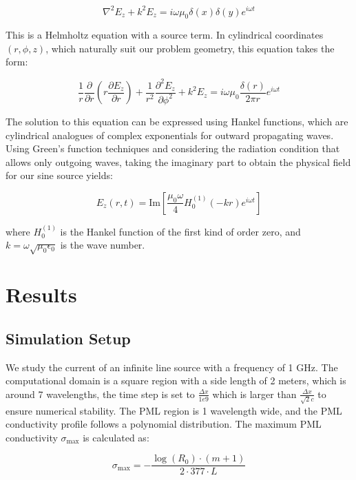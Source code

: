 \documentclass[journal]{IEEEtran}
\begin{document}
\begin{equation}
\nabla^2 E_z + k^2 E_z = i\omega\mu_0\delta(x)\delta(y)e^{i\omega t}
\end{equation}

This is a Helmholtz equation with a source term. In cylindrical coordinates $(r,\phi,z)$, which naturally suit our problem geometry, this equation takes the form:

\begin{equation}
\frac{1}{r}\frac{\partial}{\partial r}\left(r\frac{\partial E_z}{\partial r}\right) + \frac{1}{r^2}\frac{\partial^2 E_z}{\partial \phi^2} + k^2 E_z = i\omega\mu_0\frac{\delta(r)}{2\pi r}e^{i\omega t}
\end{equation}

The solution to this equation can be expressed using Hankel functions, which are cylindrical analogues of complex exponentials for outward propagating waves. Using Green's function techniques and 
considering the radiation condition that allows only outgoing waves, taking the imaginary part to obtain the physical field for our sine source yields:

\begin{equation}
E_z(r,t) = \text{Im}\left[\frac{\mu_0 \omega}{4}H_0^{(1)}(-kr)e^{i\omega t}\right]
\end{equation}

where $H_0^{(1)}$ is the Hankel function of the first kind of order zero, and $k = \omega\sqrt{\mu_0\epsilon_0}$ is the wave number. 




\section{Results}
\subsection{Simulation Setup}
We study the current of an infinite line source with a frequency of 1 GHz. The computational domain is a square region with a side length 
of 2 meters, which is around 7 wavelengths, the time step is set to $\frac{\Delta x}{1e9} $ which is larger than $\frac{\Delta x}{\sqrt{2}c}$ to
ensure numerical stability.
The PML region is 1 wavelength wide, and the PML conductivity profile follows a polynomial distribution. 
The maximum PML conductivity $\sigma_{\max}$ is calculated as:

\begin{equation}
\sigma_{\max} = -\frac{\log(R_0) \cdot (m+1)}{2 \cdot 377 \cdot L}
\end{equation}
\end{document}
